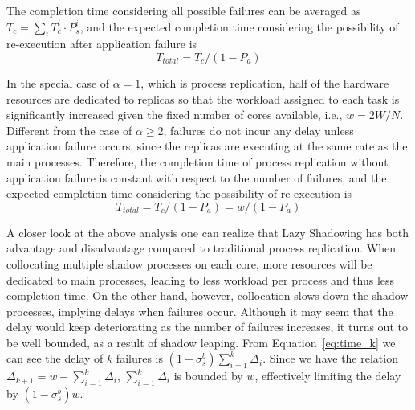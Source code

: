 The completion time considering all possible failures can be averaged as $T_{c} = \sum_{i} T_{c}^{i} \cdot P_s^{i}$, and the expected completion time considering the possibility of re-execution after application failure is
\begin{equation} 
T_{total} = T_{c} / (1 - P_a)
\label{eq:exp_time}
\end{equation}

In the special case of $\alpha=1$, which is process replication, half of the hardware resources are dedicated to replicas so that the workload assigned to each task is significantly increased given the fixed number of cores available, i.e., $w=2W/N$. Different from the case of $\alpha \ge 2$, failures do not incur any delay unless application failure occurs, since the replicas are executing at the same rate as the main processes. Therefore, the completion time of process replication without application failure is constant with respect to the number of failures, and the expected completion time considering the possibility of re-execution is
\begin{equation}
	T_{total} = T_c / (1 - P_a) = w / (1 - P_a)
\end{equation}

A closer look at the above analysis one can realize that Lazy Shadowing has both advantage and disadvantage compared to traditional process replication. When collocating multiple shadow processes on each core, more resources will be dedicated to main processes, leading to less workload per process and thus less completion time. On the other hand, however, collocation slows down the shadow processes, implying delays when failures occur. Although it may seem that the delay would keep deteriorating as the number of failures increases, it turns out to be well bounded, as a result of shadow leaping. From Equation~\ref{eq:time_k} we can see the delay of $k$ failures is $(1-\sigma_s^b)\sum_{i=1}^k\Delta_i$. Since we have the relation $\Delta_{k+1} = w - \sum_{i=1}^{k}\Delta_i$, $\sum_{i=1}^{k}\Delta_i$ is bounded by $w$, effectively limiting the delay by $(1-\sigma_s^b)w$.







